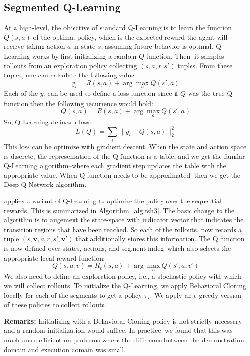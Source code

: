 \subsection{Segmented Q-Learning}
At a high-level, the objective of standard Q-Learning is to learn the function $Q(s,a)$ of the optimal policy, which is the expected reward the agent will recieve taking action $a$ in state $s$, assuming future behavior is optimal. 
Q-Learning works by first initializing a random $Q$ function. Then, it samples rollouts from an exploration policy collecting $(s,a,r, s')$ tuples. From these tuples, one can calculate the following value:
\[
y_i = R(s,a) + \arg \max_{a} Q(s',a)
\]
Each of the $y_i$ can be used to define a loss function since if $Q$ was the true Q function then the following recurrence would hold:
\[
Q(s,a) = R(s,a) + \arg \max_{a} Q(s',a)
\]
So, Q-Learning defines a loss:
\[
L(Q) = \sum_{i} \|y_i - Q(s,a)\|_2^2
\]
This loss can be optimize with gradient descent. When the state and action space is discrete, the representation of the Q function is a table, and we get the familar Q-Learning algorithm--where each gradient step updates the table with the appropriate value. When Q function needs to be approximated, then we get the Deep Q Network algorithm.

\hirl applies a variant of Q-Learning to optimize the policy over the sequential rewards. This is summarized in Algorithm~\ref{alg:tsh3}. The basic change to the algorithm is to augement the state-space with indicator vector that indicates the transition regions that have been reached. So each of the rollouts, now records a tuple $(s,\textbf{v},a,r, s', \textbf{v'})$ that additionally stores this information. The Q function is now defined over states, actions, and segment index--which also selects the appropriate local reward function:
\[
Q(s,a,v) = R_v(s,a) + \arg \max_{a} Q(s',a, v')
\]
We also need to define an exploration policy, i.e., a stochastic policy with which we will collect rollouts. To initialize the Q-Learning, we apply Behavioral Cloning locally for each of the segments to get a policy $\pi_i$. We apply an $\epsilon$-greedy version of these policies to collect rollouts.

\vspace{0.5em} \noindent \textbf{Remarks: } Initializing with a Behavioral Cloning policy is not strictly necessary and a random initialization would suffice. In practice, we found that this was much more efficient on problems where the difference between the demonstration domain and execution domain was small.

